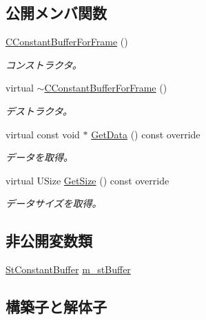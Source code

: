 \subsection*{公開メンバ関数}
\begin{DoxyCompactItemize}
\item 
\hyperlink{class_c_constant_buffer_for_frame_ae154fb95df517a7cf0bc1bb8ca4c8a92}{C\+Constant\+Buffer\+For\+Frame} ()
\begin{DoxyCompactList}\small\item\em コンストラクタ。 \end{DoxyCompactList}\item 
virtual \hyperlink{class_c_constant_buffer_for_frame_aa82763ae45d9d8f4e1f515a1a88809fe}{$\sim$\+C\+Constant\+Buffer\+For\+Frame} ()
\begin{DoxyCompactList}\small\item\em デストラクタ。 \end{DoxyCompactList}\item 
virtual const void $\ast$ \hyperlink{class_c_constant_buffer_for_frame_a1dd7a17aa4584865227d2e4188693da9}{Get\+Data} () const  override
\begin{DoxyCompactList}\small\item\em データを取得。 \end{DoxyCompactList}\item 
virtual U\+Size \hyperlink{class_c_constant_buffer_for_frame_afbfb7c7b533d75dc65e01a3f873d6e71}{Get\+Size} () const  override
\begin{DoxyCompactList}\small\item\em データサイズを取得。 \end{DoxyCompactList}\end{DoxyCompactItemize}
\subsection*{非公開変数類}
\begin{DoxyCompactItemize}
\item 
\hyperlink{struct_c_constant_buffer_for_frame_1_1_st_constant_buffer}{St\+Constant\+Buffer} \hyperlink{class_c_constant_buffer_for_frame_aa5f6bf35a4dfbefdde7ac0d80c9b8214}{m\+\_\+st\+Buffer}
\end{DoxyCompactItemize}


\subsection{構築子と解体子}
\hypertarget{class_c_constant_buffer_for_frame_ae154fb95df517a7cf0bc1bb8ca4c8a92}{}
